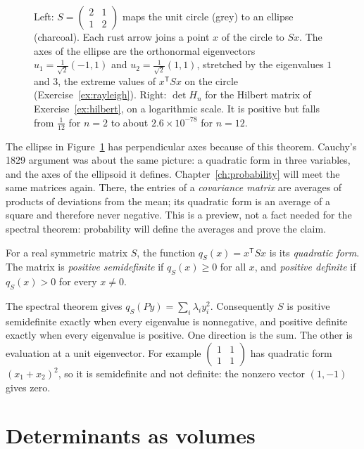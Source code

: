\begin{figure}[ht]
\centering
{}
\caption{Left: $S=\begin{pmatrix}2&1\\1&2\end{pmatrix}$ maps the unit circle (grey) to an ellipse (charcoal). Each rust arrow joins a point $x$ of the circle to $Sx$. The axes of the ellipse are the orthonormal eigenvectors $u_1=\frac1{\sqrt2}(-1,1)$ and $u_2=\frac1{\sqrt2}(1,1)$, stretched by the eigenvalues $1$ and $3$, the extreme values of $x^{\mathsf T}Sx$ on the circle (Exercise~\ref{ex:rayleigh}). Right: $\det H_n$ for the Hilbert matrix of Exercise~\ref{ex:hilbert}, on a logarithmic scale. It is positive but falls from $\frac1{12}$ for $n=2$ to about $2.6\times10^{-78}$ for $n=12$.}
\label{fig:ellipse}
\end{figure}

The ellipse in Figure~\ref{fig:ellipse} has perpendicular axes because of this theorem. Cauchy's 1829 argument was about the same picture: a quadratic form in three variables, and the axes of the ellipsoid it defines. Chapter~\ref{ch:probability} will meet the same matrices again. There, the entries of a \emph{covariance matrix} are averages of products of deviations from the mean; its quadratic form is an average of a square and therefore never negative. This is a preview, not a fact needed for the spectral theorem: probability will define the averages and prove the claim.

\begin{definitionx}
For a real symmetric matrix $S$, the function $q_S(x)=x^{\mathsf T}Sx$ is its \emph{quadratic form}. The matrix is \emph{positive semidefinite} if $q_S(x)\ge0$ for all $x$, and \emph{positive definite} if $q_S(x)>0$ for every $x\ne0$.
\end{definitionx}

The spectral theorem gives $q_S(Py)=\sum_i\lambda_i y_i^2$. Consequently $S$ is positive semidefinite exactly when every eigenvalue is nonnegative, and positive definite exactly when every eigenvalue is positive. One direction is the sum. The other is evaluation at a unit eigenvector. For example $\begin{pmatrix}1&1\\1&1\end{pmatrix}$ has quadratic form $(x_1+x_2)^2$, so it is semidefinite and not definite: the nonzero vector $(1,-1)$ gives zero.

\section{Determinants as volumes}

